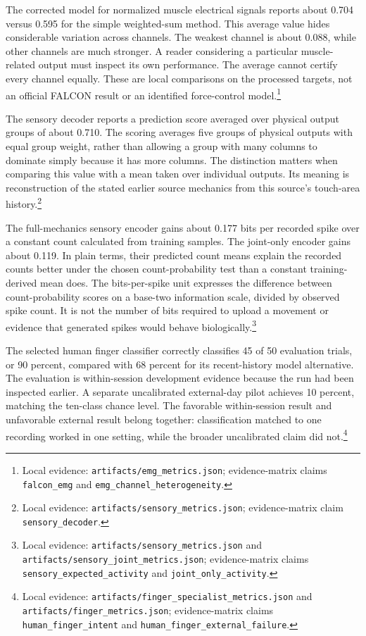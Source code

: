 The corrected model for normalized muscle electrical signals reports about 0.704 versus 0.595 for the simple weighted-sum method. This average value hides considerable variation across channels. The weakest channel is about 0.088, while other channels are much stronger. A reader considering a particular muscle-related output must inspect its own performance. The average cannot certify every channel equally. These are local comparisons on the processed targets, not an official FALCON result or an identified force-control model.\footnote{Local evidence: \texttt{artifacts/emg\_metrics.json}; evidence-matrix claims \texttt{falcon\_emg} and \texttt{emg\_channel\_heterogeneity}.}

The sensory decoder reports a prediction score averaged over physical output groups of about 0.710. The scoring averages five groups of physical outputs with equal group weight, rather than allowing a group with many columns to dominate simply because it has more columns. The distinction matters when comparing this value with a mean taken over individual outputs. Its meaning is reconstruction of the stated earlier source mechanics from this source's touch-area history.\footnote{Local evidence: \texttt{artifacts/sensory\_metrics.json}; evidence-matrix claim \texttt{sensory\_decoder}.}

The full-mechanics sensory encoder gains about 0.177 bits per recorded spike over a constant count calculated from training samples. The joint-only encoder gains about 0.119. In plain terms, their predicted count means explain the recorded counts better under the chosen count-probability test than a constant training-derived mean does. The bits-per-spike unit expresses the difference between count-probability scores on a base-two information scale, divided by observed spike count. It is not the number of bits required to upload a movement or evidence that generated spikes would behave biologically.\footnote{Local evidence: \texttt{artifacts/sensory\_metrics.json} and \texttt{artifacts/\allowbreak{}sensory\_\allowbreak{}joint\_\allowbreak{}metrics.json}; evidence-matrix claims \texttt{sensory\_expected\_activity} and \texttt{joint\_only\_activity}.}

The selected human finger classifier correctly classifies 45 of 50 evaluation trials, or 90 percent, compared with 68 percent for its recent-history model alternative. The evaluation is within-session development evidence because the run had been inspected earlier. A separate uncalibrated external-day pilot achieves 10 percent, matching the ten-class chance level. The favorable within-session result and unfavorable external result belong together: classification matched to one recording worked in one setting, while the broader uncalibrated claim did not.\footnote{Local evidence: \texttt{artifacts/finger\_specialist\_metrics.json} and \texttt{\mbox{artifacts}/\allowbreak{}\mbox{finger}\_\allowbreak{}\mbox{metrics}.\allowbreak{}\mbox{json}}; evidence-matrix claims \texttt{human\_finger\_intent} and \texttt{\mbox{human}\_\allowbreak{}\mbox{finger}\_\allowbreak{}\mbox{external}\_\allowbreak{}\mbox{failure}}.}

